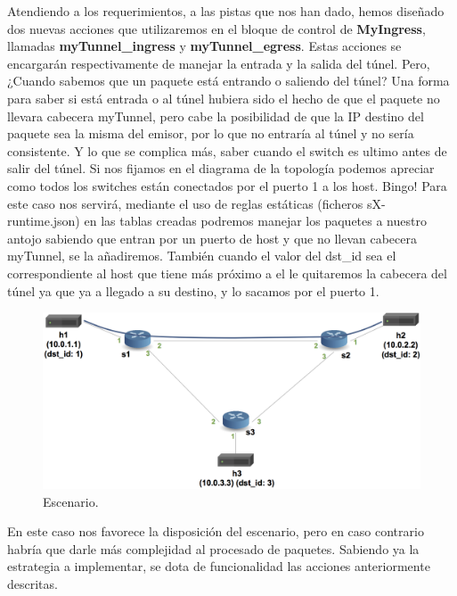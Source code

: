 Atendiendo a los requerimientos, a las pistas que nos han dado, hemos diseñado dos nuevas acciones que utilizaremos en el bloque de control de \textbf{MyIngress}, llamadas \textbf{myTunnel\_ingress} y \textbf{myTunnel\_egress}. Estas acciones se encargarán respectivamente de manejar la entrada y la salida del túnel. Pero, ¿Cuando sabemos que un paquete está entrando o saliendo del túnel? Una forma para saber si está entrada o al túnel hubiera sido el hecho de que el paquete no llevara cabecera myTunnel, pero cabe la posibilidad de que la IP destino del paquete sea la misma del emisor, por lo que no entraría al túnel y no sería consistente. Y lo que se complica más, saber cuando el switch es ultimo antes de salir del túnel.\newline
\newline
Si nos fijamos en el diagrama de la topología podemos apreciar como todos los switches están conectados por el puerto 1 a los host. Bingo! Para este caso nos servirá, mediante el uso de reglas estáticas (ficheros sX-runtime.json) en las tablas creadas podremos manejar los paquetes a nuestro antojo sabiendo que entran por un puerto de host y que no llevan cabecera myTunnel, se la añadiremos. También cuando el valor del dst\_id sea el correspondiente al host que tiene más próximo a el le quitaremos la cabecera del túnel ya que ya a llegado a su destino, y lo sacamos por el puerto 1.
\newline
\begin{figure}[!htb]
  \centering
    \includegraphics[width=\linewidth]{./img/test/8.png}
    \caption{Escenario.}
  \label{fig:yo}
\end{figure}
\newline
En este caso nos favorece la disposición del escenario, pero en caso contrario habría que darle más complejidad al procesado de paquetes. Sabiendo ya la estrategia a implementar, se dota de funcionalidad las acciones anteriormente descritas. 
\newpage
